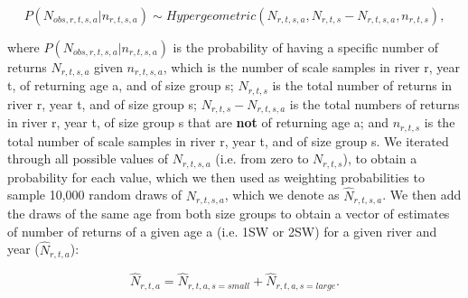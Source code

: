 \documentclass[12pt]{article}
\begin{document}

\begin{equation}
P(N_{obs,r,t,s,a}|n_{r,t,s,a}) \sim Hypergeometric(N_{r,t,s,a}, N_{r,t,s} - N_{r,t,s,a}, n_{r,t,s}),
\end{equation}

where $P(N_{obs,r,t,s,a}|n_{r,t,s,a})$ is the probability of having a specific number of returns $N_{r,t,s,a}$ given
$n_{r,t,s,a}$, which is the number of scale samples in river r, year t, of returning age a, and of size group s;
$N_{r,t,s}$ is the total number of returns in river r, year t, and of size group s;
$N_{r,t,s} - N_{r,t,s,a}$ is the total numbers of returns in river r, year t, of size group s that are \textbf{not} of returning age a;
and $n_{r,t,s}$ is the total number of scale samples in river r, year t, and of size group s.
We iterated through all possible values of $N_{r,t,s,a}$ (i.e. from zero to $N_{r,t,s}$), to obtain a probability for each value, which
we then used as weighting probabilities to sample 10,000 random draws of $N_{r,t,s,a}$, which we denote as $\hat{N}_{r,t,s,a}$.
We then add the draws of the same age from both size groups to obtain a vector of estimates of number of returns of a given age a (i.e. 1SW or 2SW) for a given river and year ($\hat{N}_{r,t,a}$):




\begin{equation}
    \hat{N}_{r,t,a} = \hat{N}_{r,t,a,s=small }+ \hat{N}_{r,t,a,s=large}.
\end{equation}
\end{document}
